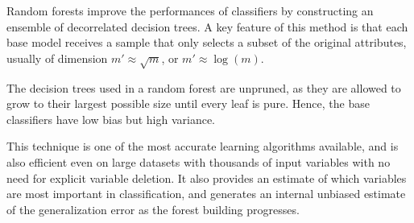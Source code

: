 Random forests improve the performances of classifiers by constructing an ensemble of decorrelated decision trees. A key feature of this method is that each base model receives a sample that only selects a subset of the original attributes, usually of dimension $m' \approx \sqrt{m}$, or $m' \approx \log(m)$.

The decision trees used in a random forest are unpruned, as they are allowed to grow to their largest possible size until every leaf is pure. Hence, the base classifiers have low bias but high variance.

This technique is one of the most accurate learning algorithms available, and is also efficient even on large datasets with thousands of input variables with no need for explicit variable deletion. It also provides an estimate of which variables are most important in classification, and generates an internal unbiased estimate of the generalization error as the forest building progresses.